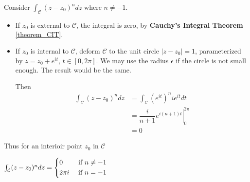 \documentclass[12pt,titlepage]{article}
\begin{document}
Consider $\int_{\mathcal{C}} (z-z_0)^n dz$ where $n \neq -1$. \begin{itemize}
	\item If $z_0$ is external to $\mathcal{C}$, the integral is zero, by \textbf{Cauchy's Integral Theorem} \ref{theorem_CIT}. 
	\item If $z_0$ is internal to $\mathcal{C}$, deform $\mathcal{C}$ to the unit circle $|z - z_0| = 1$, parameterized by $z = z_0 + e^{it}$, $t \in [0,2\pi]$. We may use the radius $\epsilon$ if the circle is not small enough. The result would be the same. 
	
	Then \begin{align*}
		\int_{\mathcal{C}} (z-z_0)^n dz &= \int_{\mathcal{C}} \left(e^{it}\right)^n i e^{it} dt\\
		&= \left. \dfrac{i}{n+1} e^{i (n+1)t} \right|_0^{2\pi}\\
		&= 0
	\end{align*}
\end{itemize}
Thus for an interioir point $z_0$ in $\mathcal{C}$ \begin{tcolorbox}[hbox, before=\par\smallskip\centering]
	$\int_{\mathcal{C}} (z-z_0)^n dz = \begin{dcases}
		0 & \text{ if } n\neq -1\\
		2\pi i & \text{ if } n= -1
	\end{dcases}$
\end{tcolorbox}
\end{document}

